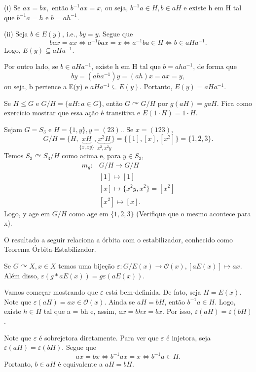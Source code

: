 \documentclass[Algebra/algebra_notes.tex]{subfiles}
\begin{document}
\begin{proof*}
	(i) Se \(ax = bx,\) então \(b^{-1}ax = x\), ou seja, \(b^{-1}a\in H, b\in aH\) e existe h em H tal que \(b^{-1}a = h\) e \(b = ah^{-1}\).

	(ii) Seja \(b\in E(y)\), i.e., \(by=y.\) Segue que
	\[
		bax = ax \Longleftrightarrow a^{-1}bax = x \Longleftrightarrow a^{-1}ba\in H \Longleftrightarrow b\in aHa^{-1}.
	\]
	Logo, \(E(y)\subseteq{aHa^{-1}}\).

	Por outro lado, se \(b\in aHa^{-1}\), existe h em H tal que \(b = aha^{-1}\), de forma que
	\[
		by = (aha^{-1})y = (ah)x = ax = y,
	\]
	ou seja, b pertence a E(y) e \(aHa^{-1}\subseteq{E(y)}\). Portanto, \(E(y) = aHa^{-1}.\) \qedsymbol
\end{proof*}
\begin{example*}
	Se \(H\leq G\) e \(G/H = \{aH: a \in G\}\), então \(G \curvearrowright  G/H\) por \(g(aH) = gaH.\) Fica como exercício mostrar que essa ação
	é transitiva e \(E(1 \cdot H) = 1 \cdot H\).
\end{example*}
\begin{example*}
	Sejam \(G = S_{3}\) e \(H = \{1, y\}, y = (23).\). Se \(x=(123)\),
	\[
		G/H = \{H, \underbrace{xH}_{\{x, xy\}}, \underbrace{x^{2}H}_{x^{2}, x^{2}y}\} = \{[1], [x], [x^{2}]\} = \{\overline{1}, \overline{2}, \overline{3}\}.
	\]
	Temos \(S_{3} \curvearrowright S_{3}/H\) como acima e, para \(y\in S_{3}\),
	\begin{align*}
		m_{g}: & G/H\rightarrow G/H                    \\
		       & [1]\mapsto[1]                         \\
		       & [x]\mapsto\{x^{2}y, x^{2}\} = [x^{2}] \\
		       & [x^{2}]\mapsto[x].
	\end{align*}
	Logo, y age em \(G/H\) como age em \(\{1, 2, 3\}\) (Verifique que o mesmo acontece para x).
\end{example*}
O resultado a seguir relaciona a órbita com o estabilizador, conhecido como Teorema Órbita-Estabilizador.
\hypertarget{orbit_stabilizer}{
	\begin{theorem*}
		Se \(G \curvearrowright X, x\in X\) temos uma bijeção \(\varepsilon :G/E(x)\rightarrow \mathcal{O}(x), [aE(x)]\mapsto ax\). Além disso,
		\(\varepsilon (g*aE(x)) = g\varepsilon (aE(x))\).
	\end{theorem*}
}
\begin{proof*}
	Vamos começar mostrando que \(\varepsilon \) está bem-definida. De fato, seja \(H = E(x)\). Note que \(\varepsilon (aH) = ax\in \mathcal{O}(x)\).
	Ainda se \(aH = bH\), então \(b^{-1}a\in H.\) Logo, existe \(h\in H\) tal que a = bh e, assim, \(ax = bhx = bx.\) Por isso, \(\varepsilon (aH) = \varepsilon (bH)\).

	Note que \(\varepsilon  \) é sobrejetora diretamente. Para ver que \(\varepsilon \) é injetora, seja \(\varepsilon (aH) = \varepsilon (bH)\). Segue que
	\[
		ax = bx \Longleftrightarrow b^{-1}ax = x \Longleftrightarrow b^{-1}a\in H.
	\]
	Portanto, \(b\in aH\) é equivalente a \(aH = bH\). \qedsymbol
\end{proof*}
\end{document}
